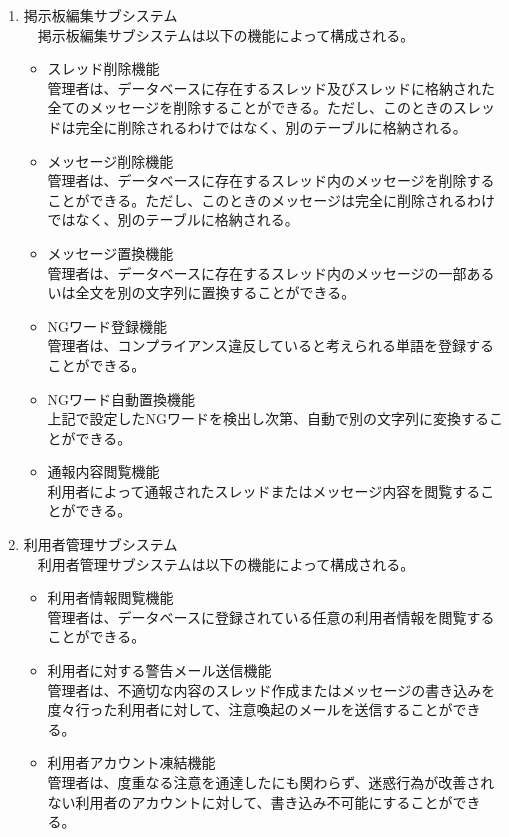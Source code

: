 \documentclass[a4j]{jarticle}
\begin{document}
\begin{enumerate}
  \item 掲示板編集サブシステム\\
  　掲示板編集サブシステムは以下の機能によって構成される。
  \begin{itemize}
    \item スレッド削除機能\\
    管理者は、データベースに存在するスレッド及びスレッドに格納された全てのメッセージを削除することができる。ただし、このときのスレッドは完全に削除されるわけではなく、別のテーブルに格納される。
    \item メッセージ削除機能\\
    管理者は、データベースに存在するスレッド内のメッセージを削除することができる。ただし、このときのメッセージは完全に削除されるわけではなく、別のテーブルに格納される。
    \item メッセージ置換機能\\
    管理者は、データベースに存在するスレッド内のメッセージの一部あるいは全文を別の文字列に置換することができる。
    \item NGワード登録機能\\
    管理者は、コンプライアンス違反していると考えられる単語を登録することができる。
    \item NGワード自動置換機能\\
    上記で設定したNGワードを検出し次第、自動で別の文字列に変換することができる。
    \item 通報内容閲覧機能\\
    利用者によって通報されたスレッドまたはメッセージ内容を閲覧することができる。\\
  \end{itemize}

  \item 利用者管理サブシステム\\
  　利用者管理サブシステムは以下の機能によって構成される。
  \begin{itemize}
    \item 利用者情報閲覧機能\\
    管理者は、データベースに登録されている任意の利用者情報を閲覧することができる。
    \item 利用者に対する警告メール送信機能\\
    管理者は、不適切な内容のスレッド作成またはメッセージの書き込みを度々行った利用者に対して、注意喚起のメールを送信することができる。
    \item 利用者アカウント凍結機能\\
    管理者は、度重なる注意を通達したにも関わらず、迷惑行為が改善されない利用者のアカウントに対して、書き込み不可能にすることができる。\\
  \end{itemize}


\end{enumerate}
\end{document}
